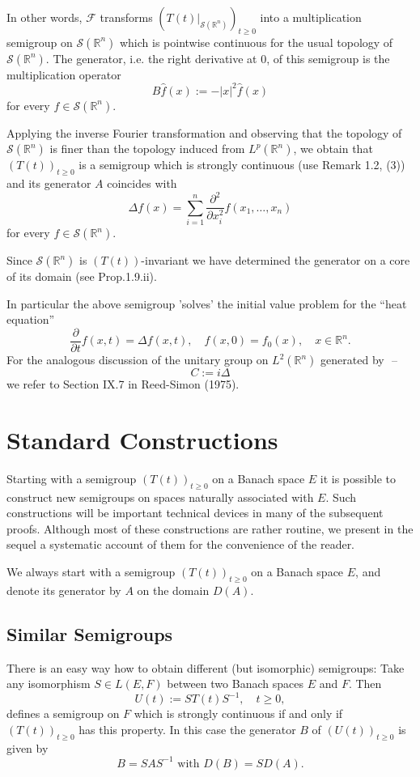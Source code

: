 In other words, $\mathcal{F}$ transforms $(T(t)|_{\mathcal{S}(\mathbb{R}^n)})_{t \geq 0}$ into a multiplication semigroup on $\mathcal{S}(\mathbb{R}^n)$ which is pointwise continuous for the usual topology of $\mathcal{S}(\mathbb{R}^n)$.
The generator, i.e. the right derivative at 0, of this semigroup is the multiplication operator
\[
B\hat{f}(x) := -|x|^2\hat{f}(x)
\]
for every $f \in \mathcal{S}(\mathbb{R}^n)$.

Applying the inverse Fourier transformation and observing that the topology of $\mathcal{S}(\mathbb{R}^n)$ is finer than the topology induced from $L^p(\mathbb{R}^n)$, we obtain that $(T(t))_{t \geq 0}$ is a semigroup which is strongly continuous (use Remark 1.2, (3)) and its generator $A$ coincides with
\[
\Delta f(x) = \sum_{i=1}^n \frac{\partial^2}{\partial x_{i}^2}f(x_{1},\ldots,x_{n})
\]
for every $f \in \mathcal{S}(\mathbb{R}^n)$.

Since $\mathcal{S}(\mathbb{R}^n)$ is $(T(t))$-invariant we have determined the generator on a core of its domain (see Prop.1.9.ii).

In particular the above semigroup 'solves' the initial value problem for the \enquote{heat equation}
\[
\frac{\partial}{\partial t}f(x,t) = \Delta f(x,t), \quad f(x,0) = f_0(x), \quad x \in \mathbb{R}^n.
\]
For the analogous discussion of the unitary group on $L^2(\mathbb{R}^n)$ generated by
$ $  -- $ $
\[
C := i\Delta
\]
we refer to Section IX.7 in Reed-Simon (1975).
\section{Standard Constructions}
Starting with a semigroup $(T(t))_{t \geq 0}$ on a Banach space $E$ it is possible to construct new semigroups on spaces naturally associated with $E$.
Such constructions will be important technical devices in many of the subsequent proofs.
Although most of these constructions are rather routine, we present in the sequel a systematic account of them for the convenience of the reader.

We always start with a semigroup $(T(t))_{t \geq 0}$ on a Banach space $E$, and denote its generator by $A$ on the domain $D(A)$.

\subsection{Similar Semigroups}
There is an easy way how to obtain different (but isomorphic) semigroups: Take any isomorphism $S \in L(E,F)$ between two Banach spaces $E$ and $F$.
Then
\[
U(t) := ST(t)S^{-1}, \quad t \geq 0,
\]
defines a semigroup on $F$ which is strongly continuous if and only if $(T(t))_{t \geq 0}$ has this property.
In this case the generator $B$ of $(U(t))_{t \geq 0}$ is given by
\[
B = SAS^{-1} \text{ with } D(B) = SD(A).
\]
